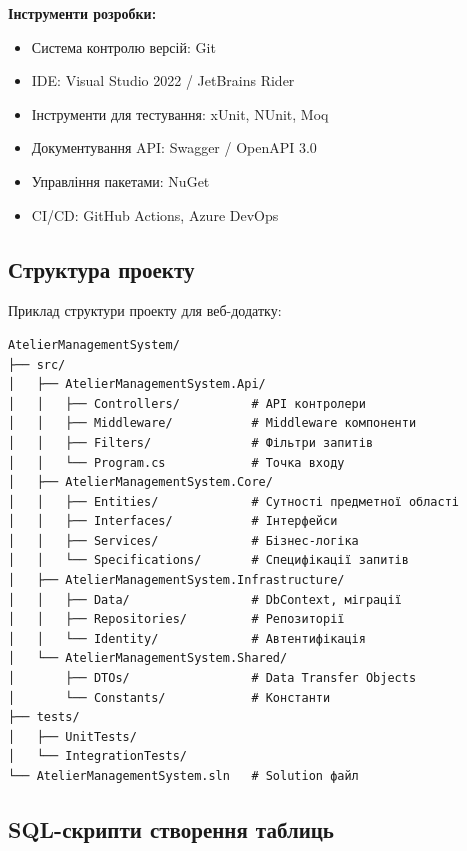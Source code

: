 \documentclass[14pt,a4paper]{extarticle}
\begin{document}
\textbf{Інструменти розробки:}
\begin{itemize}
    \item Система контролю версій: Git
    \item IDE: Visual Studio 2022 / JetBrains Rider
    \item Інструменти для тестування: xUnit, NUnit, Moq
    \item Документування API: Swagger / OpenAPI 3.0
    \item Управління пакетами: NuGet
    \item CI/CD: GitHub Actions, Azure DevOps
\end{itemize}

\subsection{Структура проекту}

Приклад структури проекту для веб-додатку:

\begin{verbatim}
AtelierManagementSystem/
├── src/
│   ├── AtelierManagementSystem.Api/
│   │   ├── Controllers/          # API контролери
│   │   ├── Middleware/           # Middleware компоненти
│   │   ├── Filters/              # Фільтри запитів
│   │   └── Program.cs            # Точка входу
│   ├── AtelierManagementSystem.Core/
│   │   ├── Entities/             # Сутності предметної області
│   │   ├── Interfaces/           # Інтерфейси
│   │   ├── Services/             # Бізнес-логіка
│   │   └── Specifications/       # Специфікації запитів
│   ├── AtelierManagementSystem.Infrastructure/
│   │   ├── Data/                 # DbContext, міграції
│   │   ├── Repositories/         # Репозиторії
│   │   └── Identity/             # Автентифікація
│   └── AtelierManagementSystem.Shared/
│       ├── DTOs/                 # Data Transfer Objects
│       └── Constants/            # Константи
├── tests/
│   ├── UnitTests/
│   └── IntegrationTests/
└── AtelierManagementSystem.sln   # Solution файл
\end{verbatim}

\newpage
\subsection{SQL-скрипти створення таблиць}
\end{document}
